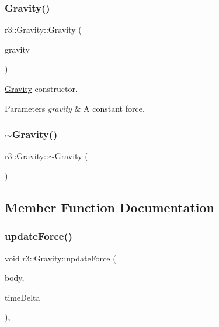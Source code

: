 \subsubsection{\texorpdfstring{Gravity()}{Gravity()}}
{\footnotesize\ttfamily r3\+::\+Gravity\+::\+Gravity (\begin{DoxyParamCaption}\item[{const glm\+::vec3 \&}]{gravity }\end{DoxyParamCaption})\hspace{0.3cm}{\ttfamily [explicit]}}



\mbox{\hyperlink{classr3_1_1_gravity}{Gravity}} constructor. 


\begin{DoxyParams}{Parameters}
{\em gravity} & A constant force. \\
\hline
\end{DoxyParams}
\mbox{\label{classr3_1_1_gravity_abdf3edf32d08b6c5b9c2fc161635f993}} 
\subsubsection{\texorpdfstring{$\sim$\+Gravity()}{~Gravity()}}
{\footnotesize\ttfamily r3\+::\+Gravity\+::$\sim$\+Gravity (\begin{DoxyParamCaption}{ }\end{DoxyParamCaption})\hspace{0.3cm}{\ttfamily [default]}}



\subsection{Member Function Documentation}
\mbox{\label{classr3_1_1_gravity_ae3152c6a922ffa193aee362e161cd4a9}} 
\subsubsection{\texorpdfstring{update\+Force()}{updateForce()}}
{\footnotesize\ttfamily void r3\+::\+Gravity\+::update\+Force (\begin{DoxyParamCaption}\item[{\mbox{\hyperlink{classr3_1_1_rigid_body}{Rigid\+Body}} $\ast$}]{body,  }\item[{\mbox{\hyperlink{namespacer3_ab2016b3e3f743fb735afce242f0dc1eb}{real}}}]{time\+Delta }\end{DoxyParamCaption})\hspace{0.3cm}{\ttfamily [override]}, {\ttfamily [virtual]}}



